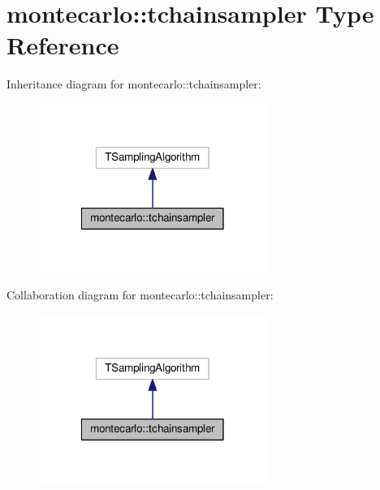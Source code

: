\hypertarget{structmontecarlo_1_1tchainsampler}{}\section{montecarlo\+:\+:tchainsampler Type Reference}
\label{structmontecarlo_1_1tchainsampler}


Inheritance diagram for montecarlo\+:\+:tchainsampler\+:
\nopagebreak
\begin{figure}[H]
\begin{center}
\leavevmode
\includegraphics[width=210pt]{structmontecarlo_1_1tchainsampler__inherit__graph}
\end{center}
\end{figure}


Collaboration diagram for montecarlo\+:\+:tchainsampler\+:
\nopagebreak
\begin{figure}[H]
\begin{center}
\leavevmode
\includegraphics[width=210pt]{structmontecarlo_1_1tchainsampler__coll__graph}
\end{center}
\end{figure}

